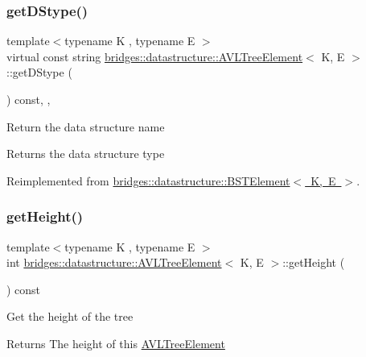 \subsubsection{\texorpdfstring{get\+D\+Stype()}{getDStype()}}
{\footnotesize\ttfamily template$<$typename K , typename E $>$ \\
virtual const string \mbox{\hyperlink{classbridges_1_1datastructure_1_1_a_v_l_tree_element}{bridges\+::datastructure\+::\+A\+V\+L\+Tree\+Element}}$<$ K, E $>$\+::get\+D\+Stype (\begin{DoxyParamCaption}{ }\end{DoxyParamCaption}) const\hspace{0.3cm}{\ttfamily [inline]}, {\ttfamily [override]}, {\ttfamily [virtual]}}

Return the data structure name \begin{DoxyReturn}{Returns}
the data structure type 
\end{DoxyReturn}


Reimplemented from \mbox{\hyperlink{classbridges_1_1datastructure_1_1_b_s_t_element_a2bb8cc9ec4b6bc5b89ecef0f17be366f}{bridges\+::datastructure\+::\+B\+S\+T\+Element$<$ K, E $>$}}.

\mbox{\label{classbridges_1_1datastructure_1_1_a_v_l_tree_element_a5d4b990d49f6f3d2f23f4dd3e57414e8}} 
\subsubsection{\texorpdfstring{get\+Height()}{getHeight()}}
{\footnotesize\ttfamily template$<$typename K , typename E $>$ \\
int \mbox{\hyperlink{classbridges_1_1datastructure_1_1_a_v_l_tree_element}{bridges\+::datastructure\+::\+A\+V\+L\+Tree\+Element}}$<$ K, E $>$\+::get\+Height (\begin{DoxyParamCaption}{ }\end{DoxyParamCaption}) const\hspace{0.3cm}{\ttfamily [inline]}}

Get the height of the tree \begin{DoxyReturn}{Returns}
The height of this \mbox{\hyperlink{classbridges_1_1datastructure_1_1_a_v_l_tree_element}{A\+V\+L\+Tree\+Element}} 
\end{DoxyReturn}
\mbox{\label{classbridges_1_1datastructure_1_1_a_v_l_tree_element_ab05925e343b9fa71b61c71e8034e1293}} 
